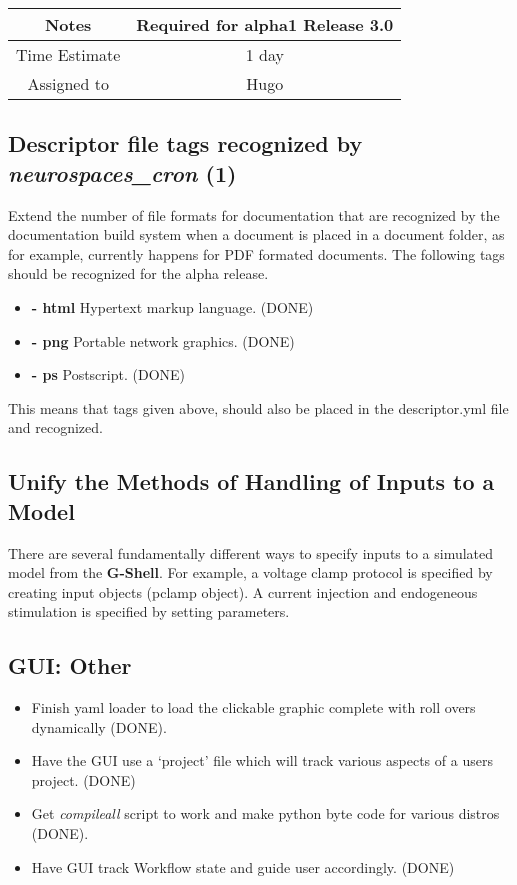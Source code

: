 \documentclass[12pt]{article}
\begin{document}
{
  \vspace{5mm}
  \centering
  \begin{tabular}{|c|c|}
    \hline
    Notes
    & Required for alpha1 Release 3.0 \\
    \hline
    Time Estimate
    & 1 day \\
    \hline
    Assigned to
    & Hugo \\
    \hline
  \end{tabular}
}


\subsection{Descriptor file tags recognized by {\it neurospaces\_cron} (1)}

Extend the number of file formats for documentation that are
recognized by the documentation build system when a document is placed
in a document folder, as for example, currently happens for PDF
formated documents. The following tags should be recognized for the
alpha release.
\begin{itemize}
   \item[]{\bf - html} Hypertext markup language. (DONE)
    \item[]{\bf - png} Portable network graphics. (DONE)
    \item[]{\bf - ps} Postscript. (DONE)
\end{itemize}
This means that tags given above, should also be placed in the
descriptor.yml file and recognized.

\subsection{Unify the Methods of Handling of Inputs to a Model}

There are several fundamentally different ways to specify inputs to a
simulated model from the {\bf G-Shell}.  For example, a voltage clamp
protocol is specified by creating input objects (pclamp object).  A
current injection and endogeneous stimulation is specified by setting
parameters.


\subsection{GUI: Other}
\begin{itemize}
\item Finish yaml loader to load the clickable graphic complete with
  roll overs dynamically (DONE).
\item Have the GUI use a `project' file which will track various
  aspects of a users project. (DONE)
\item Get {\it compileall} script to work and make python byte code for
  various distros (DONE).
\item Have GUI track Workflow state and guide user accordingly. (DONE)
\end{itemize}
\end{document}
